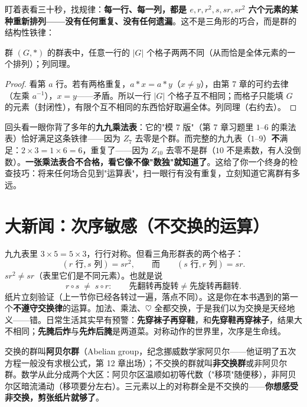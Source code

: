 盯着表看三十秒，找规律：\textbf{每一行、每一列，都是 $e, r, r^2, s, sr, sr^2$ 六个元素的某种重新排列——没有任何重复、没有任何遗漏}。这不是三角形的巧合，而是群的结构性铁律：

\begin{dingli}[群表无重复]
群 $(G, *)$ 的群表中，任意一行的 $|G|$ 个格子两两不同（从而恰是全体元素的一个排列）；列同理。
\end{dingli}
\begin{proof}
看第 $a$ 行。若有两格重复，$a*x = a*y$（$x \ne y$），由第 7 章的可约去律（左乘 $a^{-1}$），$x = y$——矛盾。所以一行 $|G|$ 个格子互不相同；而格子只能填 $G$ 的元素（封闭性），有限个互不相同的东西恰好取遍全体。列同理（右约去）。
\end{proof}

回头看一眼你背了多年的\textbf{九九乘法表}：它的"模 $7$ 版"（第 7 章习题里 $1$--$6$ 的乘法表）恰好满足这条铁律——因为 $Z_7$ 去零是个群。而完整的九九表（$1$--$9$）\textbf{不}满足：$2\times3 = 1\times6 = 6$，重复了——因为 $Z_{10}$ 去零不是群（$10$ 不是素数，有人没倒数）。\textbf{一张乘法表合不合格，看它像不像"数独"就知道了}。这给了你一个终身的检查技巧：将来任何场合见到"运算表"，扫一眼行有没有重复，立刻知道它离群有多远。

\section{大新闻：次序敏感（不交换的运算）}

九九表里 $3\times5 = 5\times3$，行行对称。但看三角形群表的两个格子：
\[
(r \text{ 行}, s \text{ 列}) = sr^2, \qquad\text{而}\qquad (s \text{ 行}, r \text{ 列}) = sr .
\]
$sr^2 \ne sr$（表里它们是不同元素）。也就是说
\[
r\circ s \;\ne\; s\circ r :
\qquad \textbf{先翻转再旋转} \ne \textbf{先旋转再翻转}.
\]
纸片立刻验证（上一节你已经各转过一遍，落点不同）。这是你在本书遇到的第一个\textbf{不遵守交换律}的运算。加法、乘法、$\heartsuit$ 全都交换，于是我们以为交换是天经地义——错。日常生活其实早有预警：\textbf{先穿袜子再穿鞋}，和\textbf{先穿鞋再穿袜子}，结果大不相同；\textbf{先腌后炸}与\textbf{先炸后腌}是两道菜。对称动作的世界里，次序是生命线。

\begin{faming}
交换的群叫\textbf{阿贝尔群}（Abelian group，纪念挪威数学家阿贝尔——他证明了五次方程一般没有求根公式，第 12 章出场）；不交换的群就叫\textbf{非交换群}或非阿贝尔群。数学从此分成两个大区：阿贝尔区温顺如初等代数（"移项"随便移），非阿贝尔区暗流涌动（移项要分左右）。三元素以上的对称群全是不交换的——\textbf{你想感受非交换，剪张纸片就够了}。
\end{faming}

